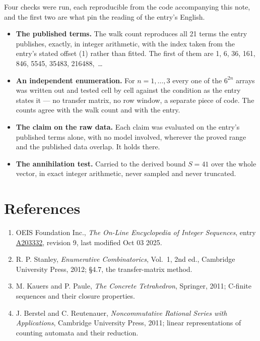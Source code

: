 \documentclass[11pt]{article}
\theoremstyle{definition}
\begin{document}
Four checks were run, each reproducible from the code accompanying this note, and the first two are what pin the reading of the entry's English.

\begin{itemize}

\item {\bfseries The published terms.} The walk count reproduces all 21 terms the entry publishes, exactly, in integer arithmetic, with the index taken from the entry's stated offset (1) rather than fitted. The first of them are 1, 6, 36, 161, 846, 5545, 35483, 216488,~\dots

\item {\bfseries An independent enumeration.} For $n = 1,\dots,3$ every one of the $6^{2n}$ arrays was written out and tested cell by cell against the condition as the entry states it --- no transfer matrix, no row window, a separate piece of code. The counts agree with the walk count and with the entry.

\item {\bfseries The claim on the raw data.} Each claim was evaluated on the entry's published terms alone, with no model involved, wherever the proved range and the published data overlap. It holds there.

\item {\bfseries The annihilation test.} Carried to the derived bound $S = 41$ over the whole vector, in exact integer arithmetic, never sampled and never truncated.

\end{itemize}

\section{References}

\begin{enumerate}

\item OEIS Foundation Inc., \emph{The On-Line Encyclopedia of Integer Sequences}, entry \href{https://oeis.org/A203332}{A203332}, revision 9, last modified Oct 03 2025.

\item R. P. Stanley, \emph{Enumerative Combinatorics}, Vol.~1, 2nd ed., Cambridge University Press, 2012; \S4.7, the transfer-matrix method.

\item M. Kauers and P. Paule, \emph{The Concrete Tetrahedron}, Springer, 2011; C-finite sequences and their closure properties.

\item J. Berstel and C. Reutenauer, \emph{Noncommutative Rational Series with Applications}, Cambridge University Press, 2011; linear representations of counting automata and their reduction.

\end{enumerate}
\end{document}
